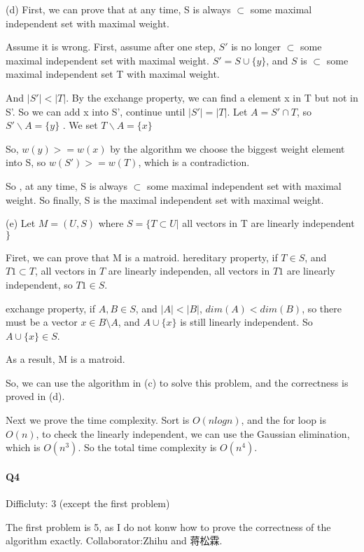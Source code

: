 \documentclass[UTF8]{ctexart}
\renewcommand{\(}{\left(}
\renewcommand{\)}{\right)}
\begin{document}
(d) First, we can prove that at any time, S is always $\subset$ some maximal independent set with maximal weight.

Assume it is wrong. First, assume after one step, $S'$ is no longer $\subset$ some maximal independent set with maximal weight. $S' = S \cup \{ y\}$, and $S$ is $\subset$ some maximal independent set T with maximal weight. 

And $\vert S' \vert < \vert T \vert$. 
By the exchange property, we can find a element x in T but not in S'. So we can add x into S', continue until $\vert S' \vert = \vert T \vert$.
Let $A = S' \cap T$, so  $S'\backslash A = \{ y\}$ . We set $T\backslash A = \{ x\}$

So, $w(y) >= w(x)$ by the algorithm we choose the biggest weight element into S, so $w(S') >= w(T)$, which is a contradiction.

So , at any time, S is always $\subset$ some maximal independent set with maximal weight. So finally, S is the maximal independent set with maximal weight.

(e) Let $M = (U, S)$ where $S = \{ T \subset U \vert$ all vectors in T are linearly independent$\}$

Firet, we can prove that M is a matroid.
hereditary property, if $T \in S$, and $T1 \subset T$, all vectors in $T$ are linearly independen,  all vectors in $T1$ are linearly independent, so $T1 \in S$.

exchange property, if $A,B \in S$, and $\vert A \vert < \vert B \vert$, $dim(A) < dim(B)$, so there must be a vector $x \in B\setminus A$, and $A\cup \{ x \} $ is 
still linearly independent. So $A\cup \{ x \} \in S$.

As a result, M is a matroid.

So, we can use the algorithm in (c) to solve this problem, and the correctness is proved in (d).

Next we prove the time complexity. Sort is $O(nlogn)$, and the for loop is $O(n)$, to check the linearly independent, we can use the Gaussian elimination, which is $O(n^3)$.
So the total time complexity is $O(n^4)$.

\paragraph{Q4}

Difficluty: 3 (except the first problem)

The first problem is 5, as I do not konw how to prove the correctness of the algorithm exactly.
Collaborator:Zhihu and 蒋松霖.
\end{document}

